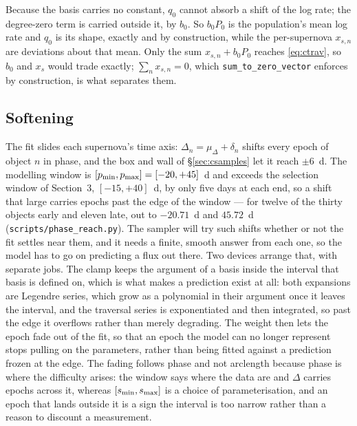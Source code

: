 \documentclass[11pt]{article}
\newcommand{\file}[1]{\texttt{#1}}
\newcommand{\code}[1]{\texttt{#1}}
\begin{document}
Because the basis carries no constant, $q_{0}$ cannot absorb a shift of the log rate; the
degree-zero term is carried outside it, by $b_{0}$. So $b_{0}P_{0}$ is the population's mean
log rate and $q_{0}$ is its shape, exactly and by construction, while the per-supernova
$x_{s,n}$ are deviations about that mean. Only the sum $x_{s,n} + b_{0}P_{0}$ reaches
\eqref{eq:ctrav}, so $b_{0}$ and $x_{s}$ would trade exactly; $\sum_{n} x_{s,n} = 0$, which
\code{sum\_to\_zero\_vector} enforces by construction, is what separates them.

\subsection{Softening}
\label{sec:csoft}

The fit slides each supernova's time axis: $\Delta_{n} = \mu_{\Delta} + \delta_{n}$ shifts
every epoch of object $n$ in phase, and the box and wall of \S\ref{sec:csamples} let it
reach $\pm6$~d. The modelling window is $[p_{\min}, p_{\max}] = [-20, +45]$~d and
exceeds the selection window of Section~3, $[-15, +40]$~d, by only five days at each end,
so a shift that large carries epochs past the edge of the window --- for twelve
of the thirty objects early and eleven late, out to $-20.71$~d and $45.72$~d
(\file{scripts/phase\_reach.py}). The sampler will try such shifts whether or not the fit
settles near them, and it needs a finite, smooth answer from each one, so the model has to
go on predicting a flux out there. Two devices arrange that, with separate jobs. The clamp
keeps the argument of a basis inside the interval that basis is defined on, which is what
makes a prediction exist at all: both expansions are Legendre series, which grow as a
polynomial in their argument once it leaves the interval, and the traversal series is
exponentiated and then integrated, so past the edge it overflows rather than merely
degrading. The weight then lets the epoch fade out of the fit, so that an epoch the model
can no longer represent stops pulling on the parameters, rather than being fitted against
a prediction frozen at the edge. The fading follows phase and not arclength because phase
is where the difficulty arises: the window says where the data are and $\Delta$ carries
epochs across it, whereas $[s_{\min}, s_{\max}]$ is a choice of parameterisation, and an
epoch that lands outside it is a sign the interval is too narrow rather than a reason to
discount a measurement.
\end{document}
